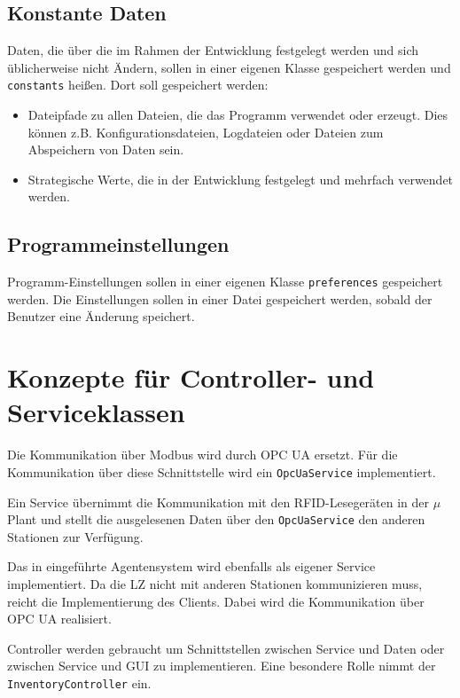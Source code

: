 \subsection{Konstante Daten}

Daten, die über die im Rahmen der Entwicklung festgelegt werden und sich üblicherweise nicht Ändern, sollen in einer
eigenen Klasse gespeichert werden und \verb|constants| heißen. 
Dort soll gespeichert werden: 

\begin{itemize}
        \item Dateipfade zu allen Dateien, die das Programm verwendet oder erzeugt. Dies können z.B. Konfigurationsdateien, Logdateien oder Dateien zum Abspeichern von Daten sein.
        \item Strategische Werte, die in der Entwicklung festgelegt und mehrfach verwendet werden. 
\end{itemize}

\subsection{Programmeinstellungen}

Programm-Einstellungen sollen in einer eigenen Klasse \verb|preferences| gespeichert werden.
Die Einstellungen sollen in einer Datei gespeichert werden, sobald der Benutzer eine Änderung speichert.

\section{Konzepte für Controller- und Serviceklassen}\label{ControllerServices}

Die Kommunikation über Modbus wird durch OPC UA ersetzt.
Für die Kommunikation über diese Schnittstelle wird ein \verb|OpcUaService| implementiert.

Ein Service übernimmt die Kommunikation mit den RFID-Lesegeräten in der $\mu$Plant und stellt die ausgelesenen Daten
über den \verb|OpcUaService| den anderen Stationen zur Verfügung.

Das in \cite{LarsKistner2017} eingeführte Agentensystem wird ebenfalls als eigener Service implementiert.
Da die LZ nicht mit anderen Stationen kommunizieren muss, reicht die Implementierung des Clients.
Dabei wird die Kommunikation über OPC UA realisiert.

Controller werden gebraucht um Schnittstellen zwischen Service und Daten oder zwischen Service und GUI zu implementieren.
Eine besondere Rolle nimmt der \verb|InventoryController| ein.

